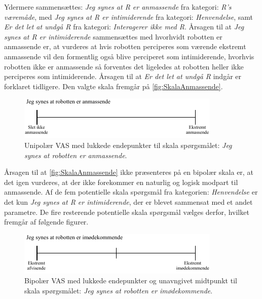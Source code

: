 Ydermere sammensættes: \textit{Jeg synes at R er anmassende} fra kategori: \textit{R's væremåde}, med \textit{Jeg synes at R er intimiderende} fra kategori: \textit{Henvendelse}, samt \textit{Er det let at undgå R} fra kategori: \textit{Interagerer ikke med R}. Årsagen til at \textit{Jeg synes at R er intimiderende} sammensættes med hvorhvidt robotten er anmassende er, at vurderes at hvis robotten perciperes som værende ekstremt anmassende vil den formentlig også blive perciperet som intimiderende, hvorhvis robotten ikke er anmassende så forventes det ligeledes at robotten heller ikke perciperes som intimiderende. Årsagen til at \textit{Er det let at undgå R} indgår er forklaret tidligere. Den valgte skala fremgår på \autoref{fig:SkalaAnmassende}.  
%
\begin{figure}[H]
\centering
\includegraphics[width =\textwidth]{Figure/UdvalgteSkalaer/Anmassende} 
\caption{Unipolær VAS med lukkede endepunkter til skala spørgsmålet: \textit{Jeg synes at robotten er anmassende}.}
\label{fig:SkalaAnmassende}
\end{figure}
\noindent
%
Årsagen til at \autoref{fig:SkalaAnmassende} ikke præsenteres på en bipolær skala er, at det igen vurderes, at der ikke forekommer en naturlig og logisk modpart til anmassende. Af de fem potentielle skala spørgsmål fra kategorien: \textit{Henvendelse} er det kun \textit{Jeg synes at R er intimiderende}, der er blevet sammensat med et andet parametre. De fire resterende potentielle skala spørgsmål vælges derfor, hvilket fremgår af følgende figurer.    
%
\begin{figure}[H]
\centering
\includegraphics[width =\textwidth]{Figure/UdvalgteSkalaer/Imoedekommende} 
\caption{Bipolær VAS med lukkede endepunkter og unavngivet midtpunkt til skala spørgsmålet: \textit{Jeg synes at robotten er imødekommende}.}
\label{fig:SkalaImoedekommende}
\end{figure}
\noindent
%
